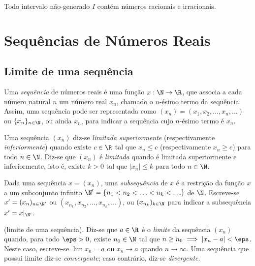 \documentclass{article}
\begin{document}
\begin{prop}
    Todo intervalo não-generado \(I\) contém números racionais e irracionais.
\end{prop}

\section{Sequências de Números Reais}

\subsection{Limite de uma sequência}

\begin{defn}
    Uma \emph{sequência} de números reais é uma função \(x: \N \to \R\), que associa a cada número natural \(n\) um número real \(x_n\), chamado o \(n\)-ésimo termo da sequência. Assim, uma sequência pode ser representada como \((x_n) = (x_1, x_2, \ldots, x_n, \ldots)\) ou \(\{x_n\}_{n\in\N}\), ou ainda \(x_n\), para indicar a sequência cujo \(n\)-ésimo termo é \(x_n\).
\end{defn}

\begin{defn}
    Uma sequência \((x_n)\) diz-se \emph{limitada superiormente} (respectivamente \emph{inferiormente}) quando existe \(c \in \R\) tal que \(x_n \leq c\) (respectivamente \(x_n \geq c\)) para todo \(n \in \N\). Diz-se que \((x_n)\) é \emph{limitada} quando é limitada superiormente e inferiormente, isto é, existe \(k>0\) tal que \(|x_n| \leq k\) para todo \(n \in \N\).
\end{defn}

\begin{defn}
    Dada uma sequência \(x = (x_n)\), uma \emph{subsequência} de \(x\) é a restrição da função \(x\) a um subconjunto infinito \(\N' = \{n_1 < n_2 < \ldots < n_k < \ldots\}\) de \(\N\). Escreve-se \(x' = (x_n)_{n \in \N'}\) ou \((x_{n_1}, x_{n_2}, \ldots, x_{n_k}, \ldots)\), ou \((x_{n_k})_{k \in \N}\) para indicar a subsequência \(x' = x|_{\N'}\).
\end{defn}

\begin{defn} (limite de uma sequência).
    Diz-se que \(a \in \R\) é o \emph{limite} da sequência \((x_n)\) quando, para todo \(\eps > 0\), existe \(n_0 \in \N\) tal que \(n \geq n_0 \implies |x_n - a| < \eps\). Neste caso, escreve-se \(\lim x_n = a\) ou \(x_n \to a\) quando \(n \to \infty\). Uma sequência que possui limite diz-se \emph{convergente}; caso contrário, diz-se \emph{divergente}.
\end{defn}
\end{document}
